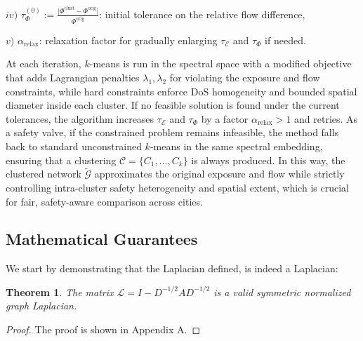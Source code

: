 \documentclass[lettersize,journal]{IEEEtran}
\newtheorem{theorem}{\normalfont\textbf{Theorem}}
\begin{document}
\textit{$iv)$} $\tau_{\Phi}^{(0)}:= \frac{\bigl|\Phi^{\mathrm{clust}} - \Phi^{\mathrm{orig}}\bigr|}{\Phi^{\mathrm{orig}}}$: initial tolerance on the relative flow difference, 
        
\textit{$v)$}  $\alpha_{\mathrm{relax}}$: relaxation factor for gradually enlarging $\tau_{\mathcal{E}}$ and $\tau_{\Phi}$ if needed.


At each iteration, $k$-means is run in the spectral space with a modified objective that adds Lagrangian penalties $\lambda_1,\lambda_2$ for violating the exposure and flow constraints, while hard constraints enforce DoS homogeneity and bounded spatial diameter inside each cluster. If no feasible solution is found under the current tolerances, the algorithm increases $\tau_{\mathcal{E}}$ and $\tau_{\Phi}$ by a factor $\alpha_{\mathrm{relax}}>1$ and retries. As a safety valve, if the constrained problem remains infeasible, the method falls back to standard unconstrained $k$-means in the same spectral embedding, ensuring that a clustering $\mathcal{C}=\{C_1,\dots,C_k\}$ is always produced. In this way, the clustered network $\tilde{\mathcal{G}}$ approximates the original exposure and flow while strictly controlling intra-cluster safety heterogeneity and spatial extent, which is crucial for fair, safety-aware comparison across cities.



\subsection{Mathematical Guarantees}
We start by demonstrating that the Laplacian defined, is indeed a Laplacian:
\begin{theorem}
The matrix $\mathcal{L} = I - D^{-1/2}AD^{-1/2}$ is a valid symmetric normalized graph Laplacian.
\end{theorem}

\begin{proof}
The proof is shown in Appendix A.
\end{proof}
\end{document}

